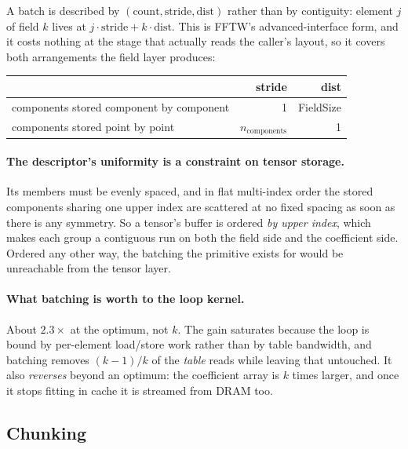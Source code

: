 \documentclass[11pt,a4paper]{article}
\begin{document}
A batch is described by $(\text{count}, \text{stride}, \text{dist})$
rather than by contiguity: element $j$ of field $k$ lives at
$j\cdot\text{stride} + k\cdot\text{dist}$.  This is FFTW's advanced-interface
form, and it costs nothing at the stage that actually reads the caller's
layout, so it covers both arrangements the field layer produces:
\begin{center}
\begin{tabular}{lrr}
  \toprule
  & stride & dist \\
  \midrule
  components stored component by component & 1 & FieldSize \\
  components stored point by point & $n_{\text{components}}$ & 1 \\
  \bottomrule
\end{tabular}
\end{center}

\paragraph{The descriptor's uniformity is a constraint on tensor storage.}
Its members must be evenly spaced, and in flat multi-index order the
stored components sharing one upper index are scattered at no fixed
spacing as soon as there is any symmetry.  So a tensor's buffer is ordered
\emph{by upper index}, which makes each group a contiguous run on both the
field side and the coefficient side.  Ordered any other way, the batching
the primitive exists for would be unreachable from the tensor layer.

\paragraph{What batching is worth to the loop kernel.}  About $2.3\times$
at the optimum, not $k$.  The gain saturates because the loop is bound by
per-element load/store work rather than by table bandwidth, and batching
removes $(k-1)/k$ of the \emph{table} reads while leaving that untouched.
It also \emph{reverses} beyond an optimum: the coefficient array is $k$
times larger, and once it stops fitting in cache it is streamed from DRAM
too.

\subsection{Chunking}
\end{document}
